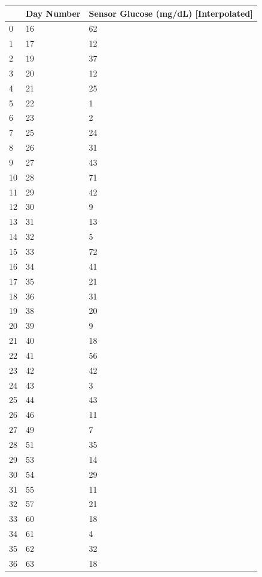 \bigskip\noindent
\begin{tabular}{p{}p{}p{}}
\toprule
 & Day Number & Sensor Glucose (mg/dL) [Interpolated] \\
\hline
0 & 16 & 62 \\
\hline
1 & 17 & 12 \\
\hline
2 & 19 & 37 \\
\hline
3 & 20 & 12 \\
\hline
4 & 21 & 25 \\
\hline
5 & 22 & 1 \\
\hline
6 & 23 & 2 \\
\hline
7 & 25 & 24 \\
\hline
8 & 26 & 31 \\
\hline
9 & 27 & 43 \\
\hline
10 & 28 & 71 \\
\hline
11 & 29 & 42 \\
\hline
12 & 30 & 9 \\
\hline
13 & 31 & 13 \\
\hline
14 & 32 & 5 \\
\hline
15 & 33 & 72 \\
\hline
16 & 34 & 41 \\
\hline
17 & 35 & 21 \\
\hline
18 & 36 & 31 \\
\hline
19 & 38 & 20 \\
\hline
20 & 39 & 9 \\
\hline
21 & 40 & 18 \\
\hline
22 & 41 & 56 \\
\hline
23 & 42 & 42 \\
\hline
24 & 43 & 3 \\
\hline
25 & 44 & 43 \\
\hline
26 & 46 & 11 \\
\hline
27 & 49 & 7 \\
\hline
28 & 51 & 35 \\
\hline
29 & 53 & 14 \\
\hline
30 & 54 & 29 \\
\hline
31 & 55 & 11 \\
\hline
32 & 57 & 21 \\
\hline
33 & 60 & 18 \\
\hline
34 & 61 & 4 \\
\hline
35 & 62 & 32 \\
\hline
36 & 63 & 18 \\

\end{tabular}
